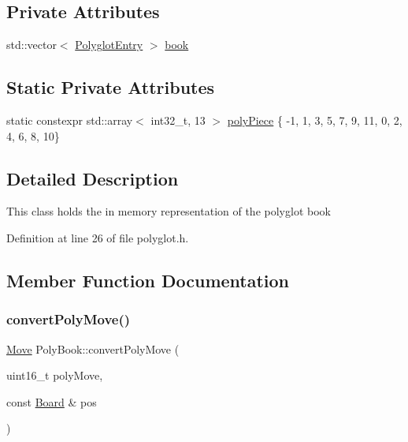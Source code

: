 \subsection*{Private Attributes}
\begin{DoxyCompactItemize}
\item 
std\+::vector$<$ \mbox{\hyperlink{structPolyglotEntry}{Polyglot\+Entry}} $>$ \mbox{\hyperlink{classPolyBook_af0e0977de41238bf9b36758ce6b898c1}{book}}
\end{DoxyCompactItemize}
\subsection*{Static Private Attributes}
\begin{DoxyCompactItemize}
\item 
static constexpr std\+::array$<$ int32\+\_\+t, 13 $>$ \mbox{\hyperlink{classPolyBook_a904f2b4eae9f4a94a11429d47906acd6}{poly\+Piece}} \{ -\/1, 1, 3, 5, 7, 9, 11, 0, 2, 4, 6, 8, 10\}
\end{DoxyCompactItemize}


\subsection{Detailed Description}
This class holds the in memory representation of the polyglot book 

Definition at line 26 of file polyglot.\+h.



\subsection{Member Function Documentation}
\mbox{\label{classPolyBook_acf3e5a4d7722aa0784e5bda2d117c0c7}} 
\subsubsection{\texorpdfstring{convert\+Poly\+Move()}{convertPolyMove()}}
{\footnotesize\ttfamily \mbox{\hyperlink{classMove}{Move}} Poly\+Book\+::convert\+Poly\+Move (\begin{DoxyParamCaption}\item[{uint16\+\_\+t}]{poly\+Move,  }\item[{const \mbox{\hyperlink{classBoard}{Board}} \&}]{pos }\end{DoxyParamCaption})\hspace{0.3cm}{\ttfamily [private]}}



